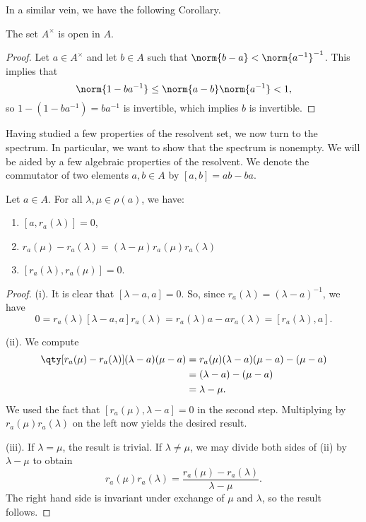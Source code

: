 In a similar vein, we have the following Corollary.

\begin{corollary}
The set $A^\times$ is open in $A$.
\end{corollary}

\begin{proof}
Let $a \in A^\times$ and let $b \in A$ such that $\norm{b - a} < \norm{a^{-1}}^{-1}$. This implies that 
\begin{equation}
\norm{1 - ba^{-1}} \leq \norm{a - b}\norm{a^{-1}} < 1,
\end{equation}
so $1 - (1 - ba^{-1}) = ba^{-1}$ is invertible, which implies $b$ is invertible. 
\end{proof}


Having studied a few properties of the resolvent set, we now turn to the spectrum. In particular, we want to show that the spectrum is nonempty. We will be aided by a few algebraic properties of the resolvent. We denote the commutator of two elements $a,b \in A$ by $[a,b] = ab - ba$.

\begin{lemma}
Let $a \in A$. For all $\lambda, \mu \in \rho(a)$, we have:
	\begin{enumerate}
		\item[\tn{(i)}] $[a, r_a(\lambda)] = 0$,
		\item[\tn{(ii)}] $r_a(\mu) - r_a(\lambda) = (\lambda - \mu)r_a(\mu)r_a(\lambda)$
		\item[\tn{(iii)}] $[r_a(\lambda), r_a(\mu)] = 0$.
	\end{enumerate}
\end{lemma}

\begin{proof}
(i). It is clear that $[\lambda - a, a] = 0$. So, since $r_a(\lambda) = (\lambda - a)^{-1}$, we have
\begin{equation}
0 = r_a(\lambda)[\lambda - a, a]r_a(\lambda) = r_a(\lambda)a -ar_a(\lambda) = [r_a(\lambda), a].
\end{equation}

(ii). We compute
\begin{equation}
\begin{aligned}
\qty[r_a(\mu) - r_a(\lambda)](\lambda - a)(\mu - a) &= r_a(\mu)(\lambda - a)(\mu - a) - (\mu - a)\\
&= (\lambda - a) - (\mu - a)\\
&= \lambda - \mu.
\end{aligned}
\end{equation}
We used the fact that $[r_a(\mu), \lambda - a] = 0$ in the second step. Multiplying by $r_a(\mu)r_a(\lambda)$ on the left now yields the desired result.

(iii). If $\lambda = \mu$, the result is trivial. If $\lambda \neq \mu$, we may divide both sides of (ii) by $\lambda - \mu$ to obtain
\begin{equation}
r_a(\mu) r_a(\lambda) = \frac{r_a(\mu) - r_a(\lambda)}{\lambda - \mu}.
\end{equation}
The right hand side is invariant under exchange of $\mu$ and $\lambda$, so the result follows.
\end{proof}

